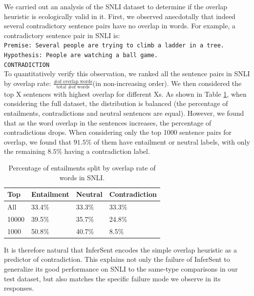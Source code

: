 We carried out an analysis of the SNLI dataset to determine if the overlap heuristic is ecologically valid in it. First, we observed anecdotally that indeed several contradictory sentence pairs have no overlap in words. For example, a contradictory sentence pair in SNLI is:\\
{\tt Premise: Several people are trying to climb a ladder in a tree. \\ Hypothesis: People are watching a ball game. \\ CONTRADICTION\\}
To quantitatively verify this observation, we ranked all the sentence pairs in SNLI by overlap rate: $\frac{\text{\# of overlap words}}{\text{total \# of words}}$(in non-increasing order). We then considered the top X sentences with highest overlap for different Xs. As shown in Table \ref{tab:highOverlap}, when considering the full dataset, the distribution is balanced (the percentage of entailments, contradictions and neutral sentences are equal). However, we found that as the word overlap in the sentences increases, the percentage of contradictions drops. When considering only the top 1000 sentence pairs for overlap, we found that $91.5\%$ of them have entailment or neutral labels, with only the remaining $8.5\%$ having a contradiction label. 

\begin{table}[htb]
  \begin{center}
  \begin{tabular}{llll}
  \toprule
     Top &Entailment & Neutral & Contradiction \\
    \midrule
All & 33.4\% & 33.3\% & 33.3\% \\
10000 & 39.5\% & 35.7\% & 24.8\%\\
 1000 & 50.8\% & 40.7\% & 8.5\%\\
 \bottomrule
  \end{tabular}
 \caption{Percentage of entailments split by overlap rate of words in SNLI.}
 \label{tab:highOverlap}
 \end{center}
\end{table}

It is therefore natural that InferSent encodes the simple overlap heuristic as a predictor of contradiction. This explains not only the failure of InferSent to generalize its good performance on SNLI to the same-type comparisons in our test dataset, but also matches the specific failure mode we observe in its responses.

